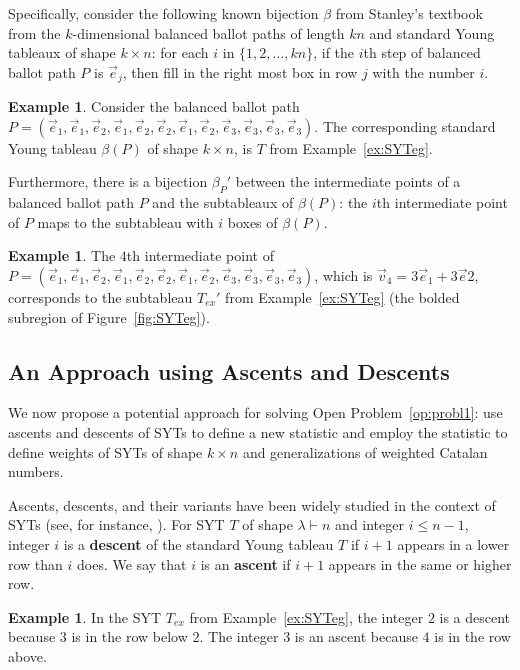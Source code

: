 \documentclass[11pt]{article}
\theoremstyle{remark}
\theoremstyle{definition}
\newtheorem{example}[theorem]{Example}
\begin{document}
Specifically, consider the following known bijection $\beta$ from Stanley’s textbook \cite{MR4621625} from the $k$-dimensional balanced ballot paths of length $kn$ and standard Young tableaux of shape $k \times n$: for each $i$ in $\{1, 2,\dots, kn\}$, if the $i$th step of balanced ballot path $P$ is $\vec{e}_j$, then fill in the right most box in row $j$ with the number $i$.
\begin{example}
Consider the balanced ballot path $P = (\vec{e}_1, \vec{e}_1, \vec{e}_2, \vec{e}_1, \vec{e}_2, \vec{e}_2, \vec{e}_1, \vec{e}_2, \vec{e}_3, \vec{e}_3, \vec{e}_3, \vec{e}_3)$. The corresponding standard Young tableau $\beta(P)$ of shape $k\times n$, is $T$ from Example~\ref{ex:SYTeg}.
\end{example}
Furthermore, there is a bijection $\beta_P'$ between the intermediate points of a balanced ballot path $P$ and the subtableaux of $\beta(P)$: the $i$th intermediate point of $P$ maps to the subtableau with $i$ boxes of $\beta(P)$.
\begin{example} The $4$th intermediate point of $P= (\vec{e}_1, \vec{e}_1, \vec{e}_2, \vec{e}_1, \vec{e}_2, \vec{e}_2, \vec{e}_1, \vec{e}_2, \vec{e}_3, \vec{e}_3, \vec{e}_3, \vec{e}_3)$, which is $\vec{v}_4 = 3\vec{e}_1+3\vec{e}2$, corresponds to the subtableau $T_{ex}'$ from Example~\ref{ex:SYTeg} (the bolded subregion of Figure~\ref{fig:SYTeg}). \end{example}
\subsection{An Approach using Ascents and Descents}\label{sec:PotentialDirection}
We now propose a potential approach for solving Open Problem~\ref{op:probl1}: use ascents and descents of SYTs to define a new statistic and employ the statistic to define weights of SYTs of shape $k \times n$ and generalizations of weighted Catalan numbers.

Ascents, descents, and their variants have been widely studied in the context of SYTs (see, for instance, \cite{MR4190402, MR4867903, MR4621625}). For SYT $T$ of shape $\lambda \vdash n$ and integer  $i \leq n-1$, integer $i$ is a \textbf{descent} of the standard Young tableau $T$ if $i+1$ appears in a lower row than $i$ does. We say that $i$ is an \textbf{ascent} if $i+1$ appears in the same or higher row.

\begin{example}
In the SYT $T_{ex}$ from Example~\ref{ex:SYTeg}, the integer $2$ is a descent because $3$ is in the row below $2$. The integer $3$ is an ascent because $4$ is in the row above.
\end{example}
\end{document}
